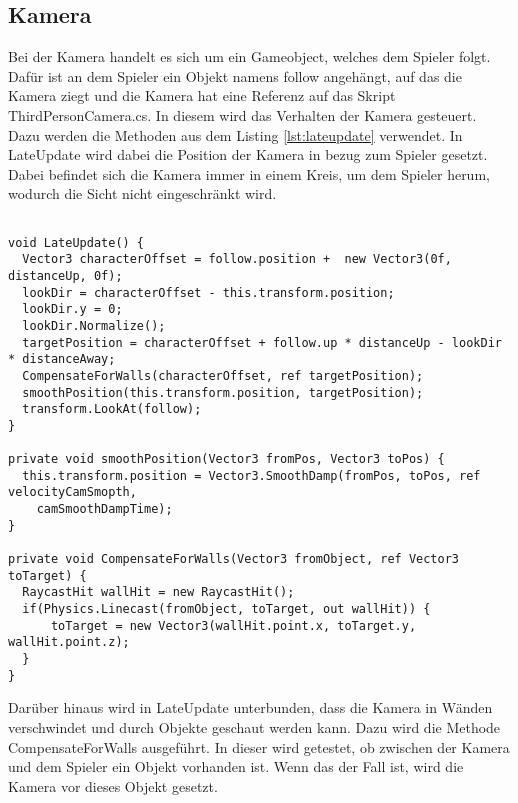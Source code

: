 \subsection{Kamera}
	Bei der Kamera handelt es sich um ein Gameobject, welches dem Spieler folgt. Dafür ist an dem Spieler ein Objekt namens follow angehängt, auf das die Kamera ziegt und die Kamera hat eine Referenz auf das Skript ThirdPersonCamera.cs. In diesem wird das Verhalten der Kamera gesteuert. Dazu werden die Methoden aus dem Listing \ref{lst:lateupdate} verwendet. In LateUpdate wird dabei die Position der Kamera in bezug zum Spieler gesetzt. Dabei befindet sich die Kamera immer in einem Kreis, um dem Spieler herum, wodurch die Sicht nicht eingeschränkt wird.

\begin{scriptsize}
\lstset{
	float,
	caption=Methode LateUpdate aus ThirdPersonCamera.cs, 
	language=[Sharp]C, 
	frame=single,  
	showstringspaces=false, 
	showspaces=false, 
	numbers=left, 
	captionpos=b, 
	belowcaptionskip=4pt,
	basicstyle=\ttfamily
} 
\begin{lstlisting}[label=lst:lateupdate]

void LateUpdate() {
  Vector3 characterOffset = follow.position +  new Vector3(0f, distanceUp, 0f);
  lookDir = characterOffset - this.transform.position;
  lookDir.y = 0;
  lookDir.Normalize();
  targetPosition = characterOffset + follow.up * distanceUp - lookDir * distanceAway;
  CompensateForWalls(characterOffset, ref targetPosition);
  smoothPosition(this.transform.position, targetPosition);
  transform.LookAt(follow);
}

private void smoothPosition(Vector3 fromPos, Vector3 toPos) {
  this.transform.position = Vector3.SmoothDamp(fromPos, toPos, ref velocityCamSmopth, 
  	camSmoothDampTime);
}

private void CompensateForWalls(Vector3 fromObject, ref Vector3 toTarget) {
  RaycastHit wallHit = new RaycastHit();
  if(Physics.Linecast(fromObject, toTarget, out wallHit)) {
      toTarget = new Vector3(wallHit.point.x, toTarget.y, wallHit.point.z);
  }
}

\end{lstlisting}
\end{scriptsize}

Darüber hinaus wird in LateUpdate unterbunden, dass die Kamera in Wänden verschwindet und durch Objekte geschaut werden kann. Dazu wird die Methode CompensateForWalls ausgeführt. In dieser wird getestet, ob zwischen der Kamera und dem Spieler ein Objekt vorhanden ist. Wenn das der Fall ist, wird die Kamera vor dieses Objekt gesetzt.

